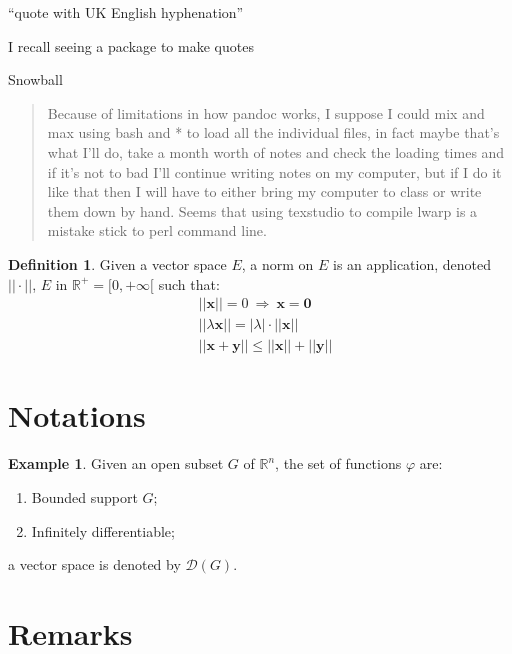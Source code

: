 \documentclass{scrreprt}
\theoremstyle{plain}
\theoremstyle{definition}
\newtheorem{definition}{Definition}[section]
\newtheorem{example}{Example}[section]
\theoremstyle{remark}
\begin{document}
\hyphenquote{UKenglish}{quote with UK English hyphenation}

\epigraph{I recall seeing a package to make quotes}{Snowball}

\begin{verse}
	
Because of limitations in how pandoc works, I suppose I could mix and max using bash and * to load all the individual files, in fact maybe that's what I'll do, take a month worth of notes and check the loading times and if it's not to bad I'll continue writing notes on my computer, but if I do it like that then I will have to either bring my computer to class or write them down by hand. Seems that using texstudio to compile lwarp is a mistake stick to perl command line.

\end{verse}

\begin{definition}
	Given a vector space $E$, a norm on $E$ is an application, denoted $||\cdot||$, $E$ in $\mathbb{R}^+=[0,+\infty[$ such that:
	\begin{align}
	& ||\mathbf{x}||=0\ \Rightarrow\ \mathbf{x}=\mathbf{0}\\
	& ||\lambda \mathbf{x}||=|\lambda|\cdot ||\mathbf{x}||\\
	& ||\mathbf{x}+\mathbf{y}||\leq ||\mathbf{x}||+||\mathbf{y}||
	\end{align}
\end{definition}


\section{Notations}

\begin{example}
	Given an open subset $G$ of $\mathbb{R}^n$, the set of functions $\varphi$ are:
	\begin{enumerate}
		\item Bounded support $G$;
		\item Infinitely differentiable;
	\end{enumerate}
	a vector space is denoted by $\mathcal{D}(G)$. 
\end{example}


\section{Remarks}
\end{document}
